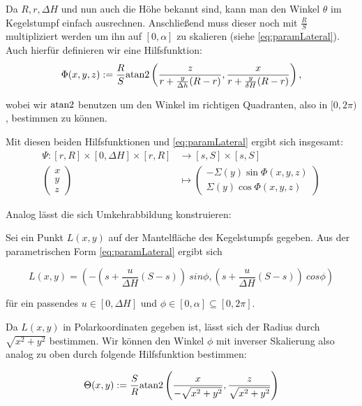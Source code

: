 Da $R, r, \Delta H$  und nun auch die Höhe bekannt sind, kann man den Winkel $\theta$ im Kegelstumpf einfach ausrechnen. Anschließend muss dieser noch mit  $\frac{R}{S}$ multipliziert werden um ihn auf $[0, \alpha]$ zu skalieren (siehe \ref{eq:paramLateral}).  Auch hierfür definieren wir eine Hilfsfunktion:
\begin{equation*}
\Phi(x,y,z) := \frac{R}{S} \text{atan2}\left(\frac{z}{r + \frac{y}{\Delta h} (R - r)}, \frac{x}{r + \frac{y}{\delta H} (R - r)}\right),
\end{equation*}

wobei wir $\text{atan2}$ benutzen um den Winkel im richtigen Quadranten, also in $[0, 2\pi)$, bestimmen zu können. 

Mit diesen beiden Hilfsfunktionen und \ref{eq:paramLateral} ergibt sich insgesamt:
\begin{equation}\label{eq:coneToLateral}
\begin{aligned}
\Psi \colon [r,R] \times [0, \Delta H] \times [r,R] &\to [s,S] \times [s,S]\\
\begin{pmatrix}
x \\ y \\ z
\end{pmatrix}  &\mapsto
\begin{pmatrix}
-\Sigma(y)\sin \Phi(x,y,z)\\
 \Sigma(y)\cos\Phi(x,y,z)
\end{pmatrix}
\end{aligned}
\end{equation}

Analog lässt die sich Umkehrabbildung konstruieren:

Sei ein Punkt $L(x,y)$ auf der Mantelfläche des Kegelstumpfs gegeben. Aus der parametrischen Form \ref{eq:paramLateral} ergibt sich

\[
L(x,y) = (-(s + \frac{u}{\Delta H}(S-s)) ~sin \phi, (s + \frac{u}{\Delta H} (S-s)) ~cos \phi)
\]

für ein passendes $u\in [0, \Delta H]$ und $\phi \in [0, \alpha] \subseteq  [0, 2\pi]$.

Da $L(x,y)$ in Polarkoordinaten gegeben ist, lässt sich der Radius durch $\sqrt{x^2+y^2}$ bestimmen. Wir können den Winkel $\phi$ mit inverser Skalierung also analog zu oben durch folgende Hilfsfunktion bestimmen:

\begin{equation*}
\Theta(x,y) := \frac{S}{R} \text{atan2}\left(\frac{x}{-\sqrt{x^2+y^2}}, \frac{z}{\sqrt{x^2+y^2}}\right)
\end{equation*}

